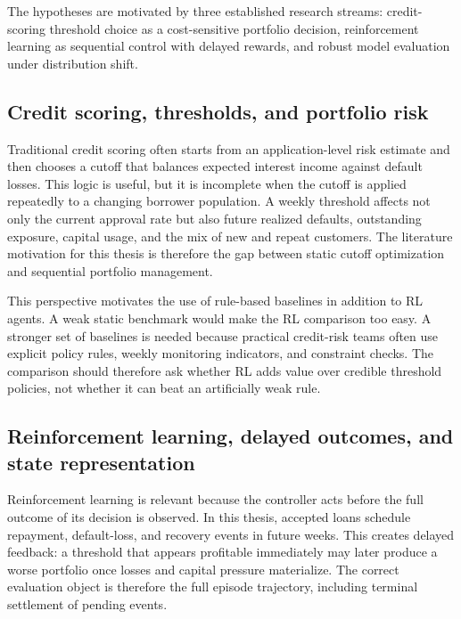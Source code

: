 \documentclass[12pt,a4paper]{article}
\begin{document}
The hypotheses are motivated by three established research streams: credit-scoring threshold choice as a cost-sensitive portfolio decision, reinforcement learning as sequential control with delayed rewards, and robust model evaluation under distribution shift.

\subsection{Credit scoring, thresholds, and portfolio risk}

Traditional credit scoring often starts from an application-level risk estimate and then chooses a cutoff that balances expected interest income against default losses. This logic is useful, but it is incomplete when the cutoff is applied repeatedly to a changing borrower population. A weekly threshold affects not only the current approval rate but also future realized defaults, outstanding exposure, capital usage, and the mix of new and repeat customers. The literature motivation for this thesis is therefore the gap between static cutoff optimization and sequential portfolio management.

This perspective motivates the use of rule-based baselines in addition to RL agents. A weak static benchmark would make the RL comparison too easy. A stronger set of baselines is needed because practical credit-risk teams often use explicit policy rules, weekly monitoring indicators, and constraint checks. The comparison should therefore ask whether RL adds value over credible threshold policies, not whether it can beat an artificially weak rule.

\subsection{Reinforcement learning, delayed outcomes, and state representation}

Reinforcement learning is relevant because the controller acts before the full outcome of its decision is observed. In this thesis, accepted loans schedule repayment, default-loss, and recovery events in future weeks. This creates delayed feedback: a threshold that appears profitable immediately may later produce a worse portfolio once losses and capital pressure materialize. The correct evaluation object is therefore the full episode trajectory, including terminal settlement of pending events.
\end{document}
